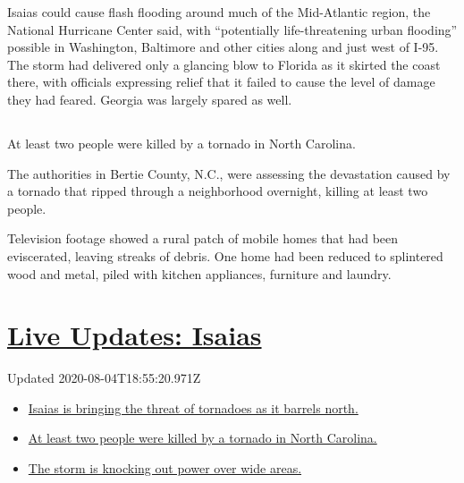 Isaias could cause flash flooding around much of the Mid-Atlantic
region, the National Hurricane Center said, with ``potentially
life-threatening urban flooding'' possible in Washington, Baltimore and
other cities along and just west of I-95. The storm had delivered only a
glancing blow to Florida as it skirted the coast there, with officials
expressing relief that it failed to cause the level of damage they had
feared. Georgia was largely spared as well.

\hypertarget{-1}{%
\subsection{}\label{-1}}

At least two people were killed by a tornado in North Carolina.

The authorities in Bertie County, N.C., were assessing the devastation
caused by a tornado that ripped through a neighborhood overnight,
killing at least two people.

Television footage showed a rural patch of mobile homes that had been
eviscerated, leaving streaks of debris. One home had been reduced to
splintered wood and metal, piled with kitchen appliances, furniture and
laundry.

\hypertarget{live-updates-isaias}{%
\section{\texorpdfstring{\href{https://www.nytimes.com/2020/08/04/us/isaias-storm-updates.html?action=click\&pgtype=Article\&state=default\&region=MAIN_CONTENT_1\&context=storylines_live_updates}{Live
Updates: Isaias}}{Live Updates: Isaias}}\label{live-updates-isaias}}

Updated 2020-08-04T18:55:20.971Z

\begin{itemize}
\tightlist
\item
  \href{https://www.nytimes.com/2020/08/04/us/isaias-storm-updates.html?action=click\&pgtype=Article\&state=default\&region=MAIN_CONTENT_1\&context=storylines_live_updates\#link-362830dd}{Isaias
  is bringing the threat of tornadoes as it barrels north.}
\item
  \href{https://www.nytimes.com/2020/08/04/us/isaias-storm-updates.html?action=click\&pgtype=Article\&state=default\&region=MAIN_CONTENT_1\&context=storylines_live_updates\#link-7961bdbc}{At
  least two people were killed by a tornado in North Carolina.}
\item
  \href{https://www.nytimes.com/2020/08/04/us/isaias-storm-updates.html?action=click\&pgtype=Article\&state=default\&region=MAIN_CONTENT_1\&context=storylines_live_updates\#link-34e5d4e4}{The
  storm is knocking out power over wide areas.}
\end{itemize}

